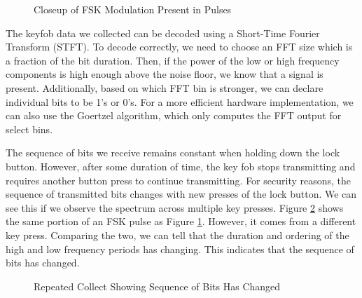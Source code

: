 \documentclass{article}
\begin{document}
\begin{figure}[H]
	\centerline{}
	\caption{Closeup of FSK Modulation Present in Pulses}
	\label{fig::car_key_spectrogram_focus}
\end{figure}

The keyfob data we collected can be decoded using a Short-Time Fourier Transform (STFT). To decode correctly, we need to choose an FFT size which is a fraction of the bit duration. Then, if the power of the low or high frequency components is high enough above the noise floor, we know that a signal is present. Additionally, based on which FFT bin is stronger, we can declare individual bits to be 1's or 0's. For a more efficient hardware implementation, we can also use the Goertzel algorithm, which only computes the FFT output for select bins. 

The sequence of bits we receive remains constant when holding down the lock button. However, after some duration of time, the key fob stops transmitting and requires another button press to continue transmitting. For security reasons, the sequence of transmitted bits changes with new presses of the lock button. We can see this if we observe the spectrum across multiple key presses. Figure \ref{fig::car_key_spectrogram_repeat} shows the same portion of an FSK pulse as Figure \ref{fig::car_key_spectrogram_focus}. However, it comes from a different key press. Comparing the two, we can tell that the duration and ordering of the high and low frequency periods has changing. This indicates that the sequence of bits has changed.

\begin{figure}[H]
	\centerline{}
	\caption{Repeated Collect Showing Sequence of Bits Has Changed}
	\label{fig::car_key_spectrogram_repeat}
\end{figure}
 
\end{document}
